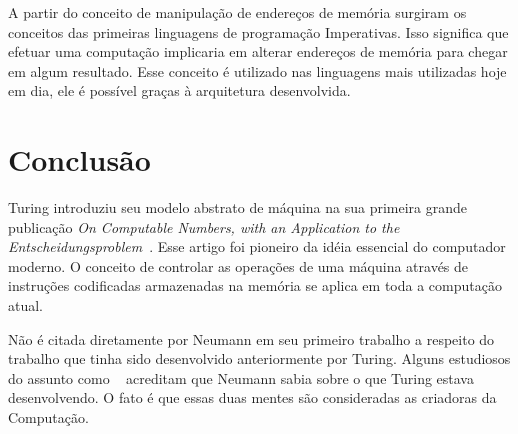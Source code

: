 \documentclass[12pt]{article}
\begin{document}
A partir do conceito de manipulação de endereços de memória surgiram os conceitos das primeiras linguagens de programação Imperativas. Isso significa que efetuar uma computação implicaria em alterar endereços de memória para chegar em algum resultado. Esse conceito é utilizado nas linguagens mais utilizadas hoje em dia, ele é possível graças à arquitetura desenvolvida.


\section{Conclusão}
Turing introduziu seu modelo abstrato de máquina na sua primeira grande publicação \emph{On Computable Numbers, with an Application to the Entscheidungsproblem}~\cite{Turing1936}.  Esse artigo foi pioneiro da idéia essencial do computador moderno. O conceito de controlar as operações de uma máquina através de instruções codificadas armazenadas  na memória se aplica em toda a computação atual.

Não é citada diretamente por Neumann em seu primeiro trabalho a respeito do trabalho que tinha sido desenvolvido anteriormente por Turing. Alguns estudiosos do assunto como ~\cite{davis2001} acreditam que Neumann sabia sobre o que Turing estava desenvolvendo. O fato é que essas duas mentes são consideradas as criadoras da Computação.



\end{document}
